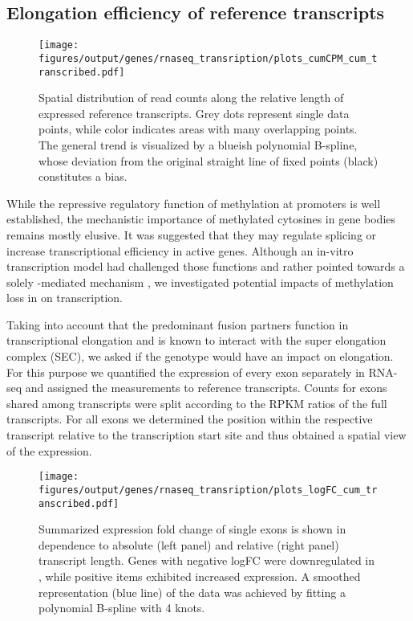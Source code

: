 \FloatBarrier
\subsection{Elongation efficiency of reference transcripts} %
\label{chap:r:transcription:elongation}

\begin{figure}[!ht]
	\centering
	\texttt{[image: figures/output/genes/rnaseq\_transription/plots\_cumCPM\_cum\_transcribed.pdf]} 
	\caption{Spatial distribution of read counts along the relative length of expressed reference transcripts. Grey dots represent single data points, while color indicates areas with many overlapping points. The general trend is visualized by a blueish polynomial B-spline, whose deviation from the original straight line of fixed points (black) constitutes a bias.}
	\label{fig:plots_cumCPM_cum_transcribed}
\end{figure}

While the repressive regulatory function of methylation at promoters is well established, the mechanistic importance of methylated cytosines in gene bodies remains mostly elusive. It was suggested that they may regulate splicing\cite{Mendizabal2017} or increase transcriptional efficiency in active genes\cite{Aran2011}. Although an in-vitro transcription model had challenged those functions and rather pointed towards a solely \histhirtysixthree-mediated mechanism \cite{Nanan2017}, we investigated potential impacts of methylation loss in \dnmtchip on transcription. 

Taking into account that the predominant  fusion partners function in transcriptional elongation\cite{Slany2009,Mohan2010,Lin2010} and \mllafnine is known to interact with the super elongation complex (SEC)\cite{Slany2016}, we asked if the \dnmtchip genotype would have an impact on elongation. For this purpose we quantified the expression of every exon separately in RNA-seq and assigned the measurements to reference transcripts. Counts for exons shared among transcripts were split according to the RPKM ratios of the full transcripts. For all exons we determined the position within the respective transcript relative to the transcription start site and thus obtained a spatial view of the expression. 

\begin{figure}[!ht]
	\centering
	\texttt{[image: figures/output/genes/rnaseq\_transription/plots\_logFC\_cum\_transcribed.pdf]} 
	\caption{Summarized expression fold change of single exons is shown in dependence to absolute (left panel) and relative (right panel) transcript length. Genes with negative logFC were downregulated in \dnmtchip, while positive items exhibited increased expression. A smoothed representation (blue line) of the data was achieved by fitting a polynomial B-spline with \num{4} knots.}
	\label{fig:plots_logFC_cum_transcribed}
\end{figure}


